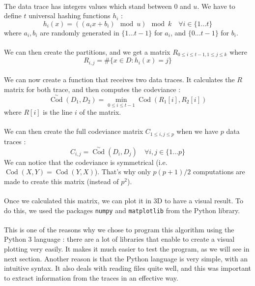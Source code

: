 \documentclass[a4paper]{article}%
\DeclareMathOperator{\Cod}{Cod}
\newcommand{\CodSk}{\overset{\sim}{\Cod}}
\begin{document}
\paragraph{}The data trace has integers values which stand between $0$ and $u$. We have to define $t$ universal hashing functions $h_i$ :
	\[ h_i(x) = ((a_ix+b_i) \mod u) \mod k \quad \forall i \in \lbrace 1 \ldots t \rbrace \]
where $a_i, b_i$ are randomly generated in $\lbrace 1 \dots t-1 \rbrace$ for $a_i$, and $\lbrace 0 \ldots t-1 \rbrace$ for $b_i$.

\paragraph{}We can then create the partitions, and we get a matrix $R_{0 \leq i \leq t-1, 1 \leq j \leq k}$ where 
 	\[ R_{i,j} = \# \lbrace x \in D : h_i(x) = j \rbrace \]
 	
\paragraph{}We can now create a function that receives two data traces. It calculates the $R$ matrix for both trace, and then computes the codeviance :
	\[ \CodSk(D_1, D_2) = \underset{0 \leq i \leq t-1}{\min} \Cod(R_1[i], R_2[i]) \]
where $R[i]$ is the line $i$ of the matrix.

\paragraph{}We can then create the full codeviance matrix $C_{1 \leq i,j \leq p}$ when we have $p$ data traces :
	\[ C_{i,j} = \CodSk(D_i, D_j) \quad \forall i,j \in \lbrace 1 \ldots p \rbrace \]
We can notice that the codeviance is symmetrical (i.e. $\Cod(X,Y) = \Cod(Y,X)$). That's why only $p(p+1)/2$ computations are made to create this matrix (instead of $p^2$).

\paragraph{}Once we calculated this matrix, we can plot it in 3D to have a visual result. To do this, we used the packages \texttt{numpy} and \texttt{matplotlib} from the Python library.

\paragraph{}This is one of the reasons why we chose to program this algorithm using the Python 3 language : there are a lot of libraries that enable to create a visual plotting very easily. It makes it much easier to test the program, as we will see in next section. Another reason is that the Python language is very simple, with an intuitive syntax. It also deals with reading files quite well, and this was important to extract information from the traces in an effective way.
\end{document}

